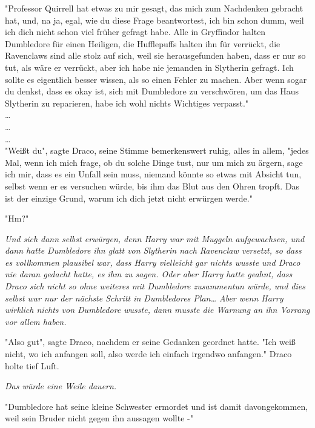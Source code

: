 {"Professor Quirrell hat etwas zu mir gesagt, das mich zum Nachdenken gebracht hat, und, na ja, egal, wie du diese Frage beantwortest, ich bin schon dumm, weil ich dich nicht schon viel früher gefragt habe. Alle in Gryffindor halten Dumbledore für einen Heiligen, die Hufflepuffs halten ihn für verrückt, die Ravenclaws sind alle stolz auf sich, weil sie herausgefunden haben, dass er nur so tut, als wäre er verrückt, aber ich habe nie jemanden in Slytherin gefragt. Ich sollte es eigentlich besser wissen, als so einen Fehler zu machen. Aber wenn sogar du denkst, dass es okay ist, sich mit Dumbledore zu verschwören, um das Haus Slytherin zu reparieren, habe ich wohl nichts Wichtiges verpasst."\\ …\\ …\\ …\\ "Weißt du", sagte Draco, seine Stimme bemerkenswert ruhig, alles in allem, "jedes Mal, wenn ich mich frage, ob du solche Dinge tust, nur um mich zu ärgern, sage ich mir, dass es ein Unfall sein muss, niemand könnte so etwas mit Absicht tun, selbst wenn er es versuchen würde, bis ihm das Blut aus den Ohren tropft. Das ist der einzige Grund, warum ich dich jetzt nicht erwürgen werde."

"Hm?"

\emph{Und sich dann selbst erwürgen, denn Harry war mit Muggeln aufgewachsen, und dann hatte Dumbledore ihn glatt von Slytherin nach Ravenclaw versetzt, so dass es vollkommen plausibel war, dass Harry vielleicht gar nichts wusste und Draco nie daran gedacht hatte, es ihm zu sagen. Oder aber Harry hatte geahnt, dass Draco sich nicht so ohne weiteres mit Dumbledore zusammentun würde, und dies selbst war nur der nächste Schritt in Dumbledores Plan… Aber wenn Harry wirklich nichts von Dumbledore wusste, dann musste die Warnung an ihn Vorrang vor allem haben.}

"Also gut", sagte Draco, nachdem er seine Gedanken geordnet hatte. "Ich weiß nicht, wo ich anfangen soll, also werde ich einfach irgendwo anfangen." Draco holte tief Luft.

\emph{Das würde eine Weile dauern.}

"Dumbledore hat seine kleine Schwester ermordet und ist damit davongekommen, weil sein Bruder nicht gegen ihn aussagen wollte -"

}
